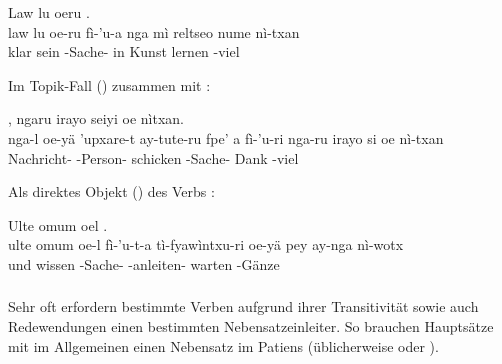 \begin{interlin}
	\glll \Npawl{}Law lu oeru      . \\
	law lu oe-ru fì-'u-a nga mì reltseo nume nì-txan \\
	klar sein  -Sache-  in Kunst lernen -viel \\
\end{interlin}

\noindent Im Topik-Fall () zusammen mit :

\begin{interlin}
	\glll \Npawl{}      , ngaru irayo seiyi oe nìtxan. \\
	nga-l oe-yä 'upxare-t ay-tute-ru fpe' a fì-'u-ri nga-ru irayo si oe nì-txan \\
	  Nachricht- -Person- schicken  -Sache-  Dank   -viel \\
\end{interlin}

\noindent Als direktes Objekt () des Verbs :

\begin{interlin}
	\glll \Npawl{}Ulte omum oel      . \\
	ulte omum oe-l fì-'u-t-a tì-fyawìntxu-ri oe-yä pey ay-nga nì-wotx \\
	und wissen  -Sache- -anleiten-  warten  -Gänze \\
\end{interlin}

\subsubsection{} Sehr oft erfordern bestimmte Verben aufgrund ihrer Transitivität sowie auch Redewendungen einen bestimmten Nebensatzeinleiter. So brauchen Hauptsätze mit   im Allgemeinen einen Nebensatz im Patiens (üblicherweise  oder ).


